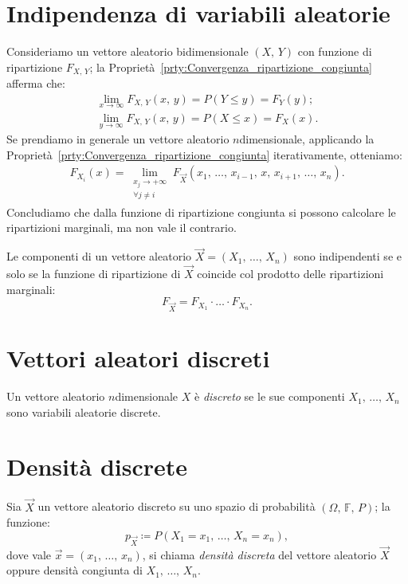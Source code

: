     \section{Indipendenza di variabili aleatorie}
        \begin{obsv}
            Consideriamo un vettore aleatorio bidimensionale $(X,\,Y)$ con funzione di ripartizione $F_{X,\,Y}$; la Proprietà~\ref{prty:Convergenza_ripartizione_congiunta} afferma che:
            \begin{gather*}
                \lim_{x \to \infty} F_{X,\,Y}(x,\,y) = P(Y \leq y) = F_Y(y); \\
                \lim_{y \to \infty} F_{X,\,Y}(x,\,y) = P(X \leq x) = F_X(x)
            .\end{gather*}
            Se prendiamo in generale un vettore aleatorio $n$\nbdash dimensionale, applicando la Proprietà~\ref{prty:Convergenza_ripartizione_congiunta} iterativamente, otteniamo:
            \begin{align*}
                F_{X_i}(x) = \lim_{\substack{x_j \rightarrow +\infty \\ \forall j \neq i}} F_{\vec{X}}(x_1,\, \ldots,\, x_{i-1},\, x,\, x_{i+1},\, \ldots,\, x_{n})
            .\end{align*}
            Concludiamo che dalla funzione di ripartizione congiunta si possono calcolare le ripartizioni marginali, ma non vale il contrario.
        \end{obsv}
        \begin{defn}
            Le componenti di un vettore aleatorio $\vec{X} = (X_1,\, \ldots,\, X_{n})$ sono indipendenti se e solo se la funzione di ripartizione di $\vec{X}$ coincide col prodotto delle ripartizioni marginali: \[
            F_{\vec{X}} = F_{X_1} \cdot \ldots \cdot F_{X_n}
            .\] 
        \end{defn}
    \section{Vettori aleatori discreti}
        \begin{defn}
            Un vettore aleatorio $n$\nbdash dimensionale $X$ è \textit{discreto} se le sue componenti $X_1,\, \ldots,\, X_{n}$ sono variabili aleatorie discrete.
        \end{defn}
    \section{Densità discrete}
        \begin{defn}\label{defn:Densità_congiunta}
            Sia $\vec{X}$ un vettore aleatorio discreto su uno spazio di probabilità $(\Omega,\,\mathbb{F},\,P)$; la funzione: \[
                p_{\vec{X}} \coloneqq P(X_1 = x_1,\, \ldots,\, X_n = x_n)
            ,\] dove vale $\vec{x} = (x_1,\, \ldots,\, x_{n})$, si chiama  \textit{densità discreta} del vettore aleatorio $\vec{X}$ oppure densità congiunta di $X_1,\, \ldots,\, X_{n}$.
        \end{defn}
